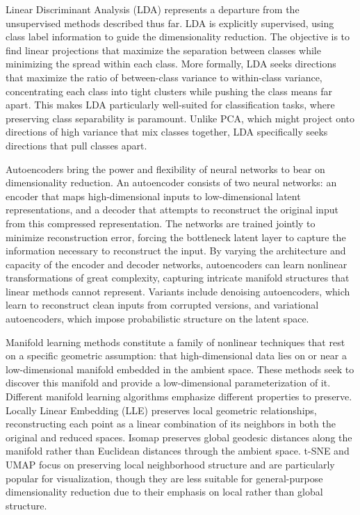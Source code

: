 Linear Discriminant Analysis (LDA) represents a departure from the unsupervised methods described thus far. LDA is explicitly supervised, using class label information to guide the dimensionality reduction. The objective is to find linear projections that maximize the separation between classes while minimizing the spread within each class. More formally, LDA seeks directions that maximize the ratio of between-class variance to within-class variance, concentrating each class into tight clusters while pushing the class means far apart. This makes LDA particularly well-suited for classification tasks, where preserving class separability is paramount. Unlike PCA, which might project onto directions of high variance that mix classes together, LDA specifically seeks directions that pull classes apart.

Autoencoders bring the power and flexibility of neural networks to bear on dimensionality reduction. An autoencoder consists of two neural networks: an encoder that maps high-dimensional inputs to low-dimensional latent representations, and a decoder that attempts to reconstruct the original input from this compressed representation. The networks are trained jointly to minimize reconstruction error, forcing the bottleneck latent layer to capture the information necessary to reconstruct the input. By varying the architecture and capacity of the encoder and decoder networks, autoencoders can learn nonlinear transformations of great complexity, capturing intricate manifold structures that linear methods cannot represent. Variants include denoising autoencoders, which learn to reconstruct clean inputs from corrupted versions, and variational autoencoders, which impose probabilistic structure on the latent space.

Manifold learning methods constitute a family of nonlinear techniques that rest on a specific geometric assumption: that high-dimensional data lies on or near a low-dimensional manifold embedded in the ambient space. These methods seek to discover this manifold and provide a low-dimensional parameterization of it. Different manifold learning algorithms emphasize different properties to preserve. Locally Linear Embedding (LLE) preserves local geometric relationships, reconstructing each point as a linear combination of its neighbors in both the original and reduced spaces. Isomap preserves global geodesic distances along the manifold rather than Euclidean distances through the ambient space. t-SNE and UMAP focus on preserving local neighborhood structure and are particularly popular for visualization, though they are less suitable for general-purpose dimensionality reduction due to their emphasis on local rather than global structure.

